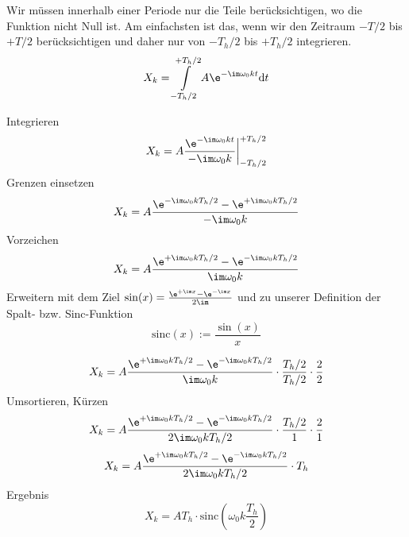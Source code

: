\begin{Ansatz}
%
Wir müssen innerhalb einer Periode nur die Teile berücksichtigen, wo
die Funktion nicht Null ist. Am einfachsten ist das, wenn wir den
Zeitraum $-T/2$ bis $+T/2$ berücksichtigen und daher nur von $-T_h/2$ bis $+T_h/2$
integrieren.
\begin{equation}
X_k =  \int\limits_{-T_h/2}^{+T_h/2} A \e^{-\im \omega_0 k t} \mathrm{d}t
\end{equation}
%
\end{Ansatz}
%
\begin{ExCalc}
Integrieren
\begin{equation}
X_k = A \frac{\e^{-\im \omega_0 k t}}{-\im \omega_0 k }\bigg|_{-T_h/2}^{+T_h/2}
\end{equation}
Grenzen einsetzen
\begin{equation}
X_k = A \frac{\e^{-\im \omega_0 k T_h/2} - \e^{+\im \omega_0 k T_h/2}}{-\im \omega_0 k }
\end{equation}
Vorzeichen
\begin{equation}
X_k = A \frac{\e^{+\im \omega_0 k T_h/2}-\e^{-\im \omega_0 k T_h/2}}{\im \omega_0 k }
\end{equation}
Erweitern mit dem Ziel $\sin(x) = \frac{\e^{+\im x}-\e^{-\im x}}{2\im}$ und zu unserer Definition der Spalt- bzw. Sinc-Funktion
$$\mathrm{sinc}(x):=\frac{\sin(x)}{x}$$

\begin{equation}
X_k = A \frac{\e^{+\im \omega_0 k T_h/2}-\e^{-\im \omega_0 k T_h/2}}{\im \omega_0 k } \cdot \frac{T_h/2}{T_h/2} \cdot \frac{2}{2}
\end{equation}
Umsortieren, Kürzen
\begin{equation}
X_k = A \frac{\e^{+\im \omega_0 k T_h/2}-\e^{-\im \omega_0 k T_h/2}}{2\im \omega_0 k T_h/2} \cdot \frac{T_h/2}{1} \cdot \frac{2}{1}
\end{equation}
%
\begin{equation}
X_k = A \frac{\e^{+\im \omega_0 k T_h/2}-\e^{-\im \omega_0 k T_h/2}}{2\im \omega_0 k T_h/2} \cdot T_h
\end{equation}
%
Ergebnis
\begin{equation}
X_k = A T_h \cdot \mathrm{sinc}(\omega_0 k \frac{T_h}{2})
\end{equation}
\end{ExCalc}

